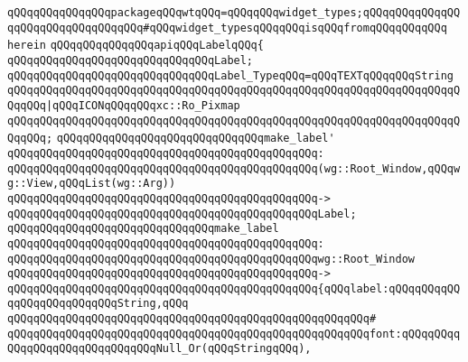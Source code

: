 \verb|qQQqqQQqqQQqqQQqpackageqQQqwtqQQq=qQQqqQQqwidget_types;qQQqqQQqqQQqqQQqqQQqqQQqqQQqqQQqqQQq#qQQqwidget_typesqQQqqQQqisqQQqfromqQQqqQQqqQQq|\newline
\verb|herein|\newline
\newline
\verb|qQQqqQQqqQQqqQQqapiqQQqLabelqQQq{|\newline
\newline
\newline
\verb|qQQqqQQqqQQqqQQqqQQqqQQqqQQqqQQqLabel;|\newline
\newline
\verb|qQQqqQQqqQQqqQQqqQQqqQQqqQQqqQQqLabel_TypeqQQq=qQQqTEXTqQQqqQQqString|\newline
\verb|qQQqqQQqqQQqqQQqqQQqqQQqqQQqqQQqqQQqqQQqqQQqqQQqqQQqqQQqqQQqqQQqqQQqqQQqqQQq|\verb#|qQQqICONqQQqqQQqxc::Ro_Pixmap#\newline
\verb|qQQqqQQqqQQqqQQqqQQqqQQqqQQqqQQqqQQqqQQqqQQqqQQqqQQqqQQqqQQqqQQqqQQqqQQqqQQq;|\newline
\newline
\verb|qQQqqQQqqQQqqQQqqQQqqQQqqQQqqQQqmake_label'|\newline
\verb|qQQqqQQqqQQqqQQqqQQqqQQqqQQqqQQqqQQqqQQqqQQqqQQq:|\newline
\verb|qQQqqQQqqQQqqQQqqQQqqQQqqQQqqQQqqQQqqQQqqQQqqQQq(wg::Root_Window,qQQqwg::View,qQQqList(wg::Arg))|\newline
\verb|qQQqqQQqqQQqqQQqqQQqqQQqqQQqqQQqqQQqqQQqqQQqqQQq->|\newline
\verb|qQQqqQQqqQQqqQQqqQQqqQQqqQQqqQQqqQQqqQQqqQQqqQQqLabel;|\newline
\newline
\verb|qQQqqQQqqQQqqQQqqQQqqQQqqQQqqQQqmake_label|\newline
\verb|qQQqqQQqqQQqqQQqqQQqqQQqqQQqqQQqqQQqqQQqqQQqqQQq:|\newline
\verb|qQQqqQQqqQQqqQQqqQQqqQQqqQQqqQQqqQQqqQQqqQQqqQQqwg::Root_Window|\newline
\verb|qQQqqQQqqQQqqQQqqQQqqQQqqQQqqQQqqQQqqQQqqQQqqQQq->|\newline
\verb|qQQqqQQqqQQqqQQqqQQqqQQqqQQqqQQqqQQqqQQqqQQqqQQq{qQQqlabel:qQQqqQQqqQQqqQQqqQQqqQQqqQQqString,qQQq|\newline
\verb|qQQqqQQqqQQqqQQqqQQqqQQqqQQqqQQqqQQqqQQqqQQqqQQqqQQqqQQq#|\newline
\verb|qQQqqQQqqQQqqQQqqQQqqQQqqQQqqQQqqQQqqQQqqQQqqQQqqQQqqQQqfont:qQQqqQQqqQQqqQQqqQQqqQQqqQQqqQQqNull_Or(qQQqStringqQQq),|\newline

